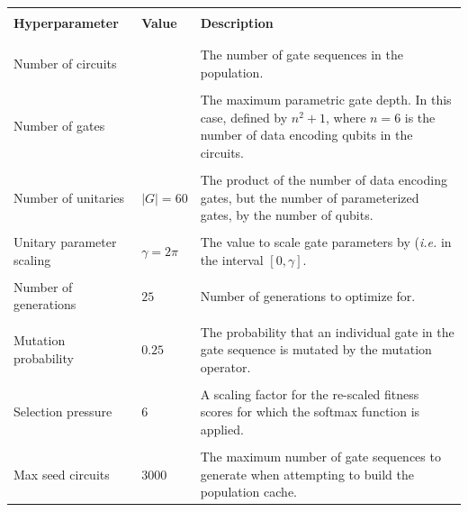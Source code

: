 \documentclass[twocolumn]{article}
\begin{document}
\begin{table}[!ht]
    \centering
    \begin{tabularx}{\textwidth}{
        >{\raggedright\arraybackslash}p{}
        >{\raggedright\arraybackslash}p{}
        >{\raggedright\arraybackslash}p{}
    }
        \toprule \\
        \textbf{Hyperparameter} & \textbf{Value} & \textbf{Description} \\
        \\ \hline \\
        Number of circuits & 100 & The number of gate sequences in the population. \\
        \vspace{0pt} \\
        Number of gates & 37 & The maximum parametric gate depth. In this case, defined by $n^2 + 1$, where $n = 6$ is the number of data encoding qubits in the circuits.  \\
        \vspace{0pt} \\
        Number of unitaries & $|G|=60$ & The product of the number of data encoding gates, but the number of parameterized gates, by the number of qubits.\\
        \vspace{0pt} \\
        Unitary parameter scaling & $\gamma = 2\pi$ & The value to scale gate parameters by (\textit{i.e.} in the interval $[0,\gamma]$.  \\
        \vspace{0pt} \\
        Number of generations & $25$ & Number of generations to optimize for. \\
        \vspace{0pt} \\
        Mutation probability & $0.25$ & The probability that an individual gate in the gate sequence is mutated by the mutation operator. \\
        \vspace{0pt} \\
        Selection pressure & $6$ & A scaling factor for the re-scaled fitness scores for which the softmax function is applied. \\
        \vspace{0pt} \\
        Max seed circuits & $3000$ & The maximum number of gate sequences to generate when attempting to build the population cache. \\

\end{tabularx}
\end{table}
\end{document}
